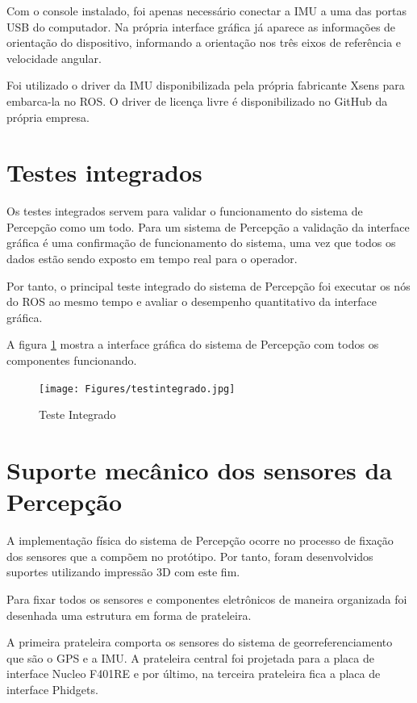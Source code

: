	     Com o console instalado, foi apenas necessário conectar a IMU a uma das portas USB do computador. Na própria interface gráfica já aparece as informações de orientação do dispositivo, informando a orientação nos três eixos de referência e velocidade angular.

		 Foi utilizado o driver da IMU disponibilizada pela própria fabricante Xsens para embarca-la no ROS. O driver de licença livre é disponibilizado no GitHub da própria empresa.	

 
\section{Testes integrados}
\label{sec:testi}

Os testes integrados servem para validar o funcionamento do sistema de Percepção como um  todo. Para um sistema de Percepção a validação da interface gráfica é uma confirmação de funcionamento do sistema, uma vez que todos os dados estão sendo exposto em tempo real para o operador. 

Por tanto, o principal teste integrado do sistema de Percepção foi executar os nós do ROS ao mesmo tempo e avaliar o desempenho quantitativo da interface gráfica.

A figura \ref{fig:testint} mostra a interface gráfica do sistema de Percepção com todos os componentes funcionando.

    \begin{figure}[!ht]
    	\centering
    	\texttt{[image: Figures/testintegrado.jpg]}
    	\caption{Teste Integrado} \label{fig:testint}
	\end{figure}

\section{Suporte mecânico dos sensores da Percepção}

A implementação física do sistema de Percepção ocorre no processo de fixação dos sensores que a compõem no protótipo. Por tanto, foram desenvolvidos suportes utilizando impressão 3D com este fim.

Para  fixar  todos  os  sensores  e  componentes  eletrônicos  de  maneira  organizada foi desenhada uma estrutura em forma de prateleira.

 A primeira prateleira comporta os sensores do sistema de georreferenciamento que são o GPS e a IMU. A prateleira central foi projetada para a placa de interface Nucleo F401RE e por último, na terceira prateleira fica a placa de interface Phidgets.
 
